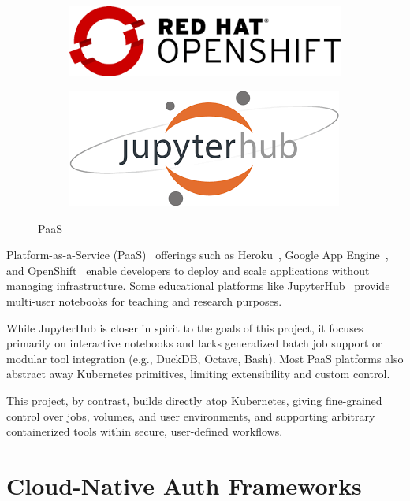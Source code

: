 \begin{figure}[h!]
\begin{subfigure}[b]{0.3\textwidth}
    \includegraphics[width=\textwidth]{Images/openshift.png}
    \label{fig:openshift}
  \end{subfigure}
  \hfill
  \begin{subfigure}[b]{0.3\textwidth}
    \includegraphics[width=\textwidth]{Images/jupyterhub.png}
    \label{fig:jupyterhub}
  \end{subfigure}

  \caption{PaaS}
  \label{fig:authservices}
\end{figure}

Platform-as-a-Service (PaaS)~\cite{nist-paas} offerings such as Heroku~\cite{heroku}, Google App Engine~\cite{appengine}, and OpenShift~\cite{openshift} enable developers to 
deploy and scale applications without managing infrastructure. Some educational platforms like JupyterHub~\cite{jupyterhub} 
provide multi-user notebooks for teaching and research purposes.

While JupyterHub is closer in spirit to the goals of this project, it focuses primarily on interactive notebooks and lacks 
generalized batch job support or modular tool integration (e.g., DuckDB, Octave, Bash). Most PaaS platforms also abstract away 
Kubernetes primitives, limiting extensibility and custom control.

This project, by contrast, builds directly atop Kubernetes, giving fine-grained control over jobs, volumes, and user environments, 
and supporting arbitrary containerized tools within secure, user-defined workflows.

\section{Cloud-Native Auth Frameworks}

